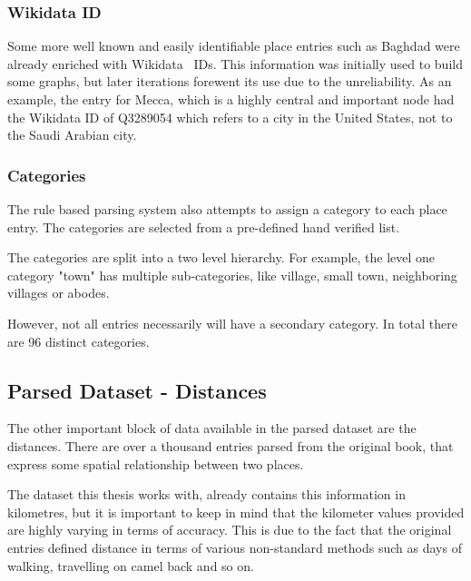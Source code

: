 \subsubsection{Wikidata ID}
Some more well known and easily identifiable place entries such as Baghdad were already enriched with Wikidata~\cite{Wikidata} IDs.
This information was initially used to build some graphs, but later iterations forewent its use due to the unreliability.
As an example, the entry for Mecca, which is a highly central and important node had the Wikidata ID of Q3289054
which refers to a city in the United States, not to the Saudi Arabian city.

\subsubsection{Categories}
The rule based parsing system also attempts to assign a category to each place entry.
The categories are selected from a pre-defined hand verified list.

The categories are split into a two level hierarchy.
For example, the level one category "town" has multiple sub-categories, like
village, small town, neighboring villages or abodes.

However, not all entries necessarily will have a secondary category.
In total there are 96 distinct categories.

\subsection{Parsed Dataset - Distances}
The other important block of data available in the parsed dataset are the distances.
There are over a thousand entries parsed from the original book, that express some spatial relationship
between two places.

The dataset this thesis works with, already contains this information in kilometres, but it is important
to keep in mind that the kilometer values provided are highly varying in terms of accuracy. This
is due to the fact that the original entries defined distance in terms of various non-standard methods
such as days of walking, travelling on camel back and so on.


